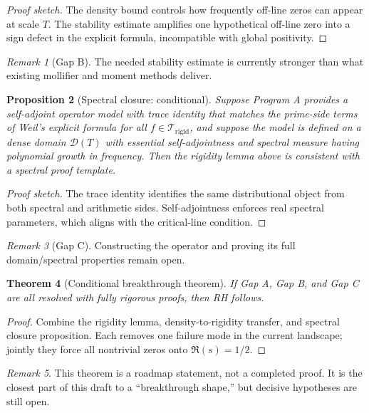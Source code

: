 \documentclass[11pt]{article}
\theoremstyle{plain}
\newtheorem{theorem}{Theorem}[section]
\newtheorem{proposition}[theorem]{Proposition}
\theoremstyle{definition}
\theoremstyle{remark}
\newtheorem{remark}[theorem]{Remark}
\begin{document}
\begin{proof}[Proof sketch]
The density bound controls how frequently off-line zeros can appear at scale $T$.
The stability estimate amplifies one hypothetical off-line zero into a sign defect in the explicit formula,
incompatible with global positivity.
\end{proof}

\begin{remark}[Gap B]
The needed stability estimate is currently stronger than what existing mollifier and moment methods deliver.
\end{remark}

\begin{proposition}[Spectral closure: conditional]
Suppose Program A provides a self-adjoint operator model with trace identity that matches the prime-side
terms of Weil's explicit formula for all $f\in\mathcal{T}_{\mathrm{rigid}}$, and suppose the model is
defined on a dense domain $\mathcal{D}(T)$ with essential self-adjointness and spectral measure
having polynomial growth in frequency.
Then the rigidity lemma above is consistent with a spectral proof template.
\end{proposition}

\begin{proof}[Proof sketch]
The trace identity identifies the same distributional object from both spectral and arithmetic sides.
Self-adjointness enforces real spectral parameters, which aligns with the critical-line condition.
\end{proof}

\begin{remark}[Gap C]
Constructing the operator and proving its full domain/spectral properties remain open.
\end{remark}

\begin{theorem}[Conditional breakthrough theorem]
If Gap A, Gap B, and Gap C are all resolved with fully rigorous proofs, then RH follows.
\end{theorem}

\begin{proof}
Combine the rigidity lemma, density-to-rigidity transfer, and spectral closure proposition.
Each removes one failure mode in the current landscape; jointly they force all nontrivial zeros onto
$\Re(s)=1/2$.
\end{proof}

\begin{remark}
This theorem is a roadmap statement, not a completed proof.
It is the closest part of this draft to a ``breakthrough shape,'' but decisive hypotheses are still open.
\end{remark}
\end{document}
